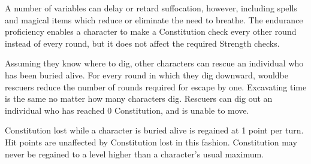A number of variables can delay or retard suffocation, however, including spells and magical items which reduce or eliminate the need to breathe. The endurance proficiency enables a character to make a Constitution check every other round instead of every round, but it does not affect the required Strength checks.

Assuming they know where to dig, other characters can rescue an individual who has been buried alive. For every round in which they dig downward, wouldbe rescuers reduce the number of rounds required for escape by one. Excavating time is the same no matter how many characters dig. Rescuers can dig out an individual who has reached 0 Constitution, and is unable to move.

Constitution lost while a character is buried alive is regained at 1 point per turn. Hit points are unaffected by Constitution lost in this fashion. Constitution may never be regained to a level higher than a character’s usual maximum.
